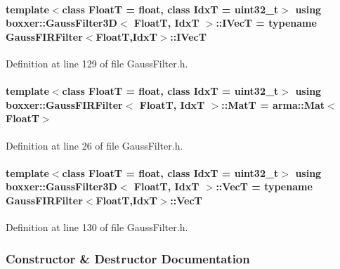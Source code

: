 \paragraph[{\texorpdfstring{I\+VecT}{IVecT}}]{\setlength{\rightskip}{0pt plus 5cm}template$<$class FloatT  = float, class IdxT  = uint32\+\_\+t$>$ using {\bf boxxer\+::\+Gauss\+Filter3D}$<$ FloatT, IdxT $>$\+::{\bf I\+VecT} =  typename {\bf Gauss\+F\+I\+R\+Filter}$<$FloatT,IdxT$>$\+::{\bf I\+VecT}}\hypertarget{classboxxer_1_1GaussFilter3D_afcdf76336ad62fdc48a77672eea9a5b7}{}\label{classboxxer_1_1GaussFilter3D_afcdf76336ad62fdc48a77672eea9a5b7}


Definition at line 129 of file Gauss\+Filter.\+h.

\paragraph[{\texorpdfstring{MatT}{MatT}}]{\setlength{\rightskip}{0pt plus 5cm}template$<$class FloatT = float, class IdxT = uint32\+\_\+t$>$ using {\bf boxxer\+::\+Gauss\+F\+I\+R\+Filter}$<$ FloatT, IdxT $>$\+::{\bf MatT} =  arma\+::\+Mat$<$FloatT$>$\hspace{0.3cm}{\ttfamily [inherited]}}\hypertarget{classboxxer_1_1GaussFIRFilter_a83cf4c7f4782f69918c0e0883fff5412}{}\label{classboxxer_1_1GaussFIRFilter_a83cf4c7f4782f69918c0e0883fff5412}


Definition at line 26 of file Gauss\+Filter.\+h.

\paragraph[{\texorpdfstring{VecT}{VecT}}]{\setlength{\rightskip}{0pt plus 5cm}template$<$class FloatT  = float, class IdxT  = uint32\+\_\+t$>$ using {\bf boxxer\+::\+Gauss\+Filter3D}$<$ FloatT, IdxT $>$\+::{\bf VecT} =  typename {\bf Gauss\+F\+I\+R\+Filter}$<$FloatT,IdxT$>$\+::{\bf VecT}}\hypertarget{classboxxer_1_1GaussFilter3D_a0b98b323516d0fcb1422b10d63a70156}{}\label{classboxxer_1_1GaussFilter3D_a0b98b323516d0fcb1422b10d63a70156}


Definition at line 130 of file Gauss\+Filter.\+h.



\subsubsection{Constructor \& Destructor Documentation}
